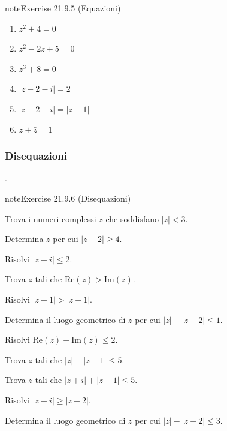 \documentclass[letterpaper,10pt,italian]{jupyterBook}
\begin{document}
\begin{sphinxadmonition}{note}{Exercise 21.9.5 (Equazioni)}
\begin{enumerate}
\item {} 
\sphinxAtStartPar
\(z^2 + 4 = 0\)

\item {} 
\sphinxAtStartPar
\(z^2 - 2z + 5 = 0\)

\item {} 
\sphinxAtStartPar
\(z^3 + 8 = 0\)

\item {} 
\sphinxAtStartPar
\(|z-2-i| = 2\)

\item {} 
\sphinxAtStartPar
\(|z-2-i| = |z-1|\)

\item {} 
\sphinxAtStartPar
\(z + \bar{z} = 1\)

\end{enumerate}


\end{sphinxadmonition}


\subsubsection{Disequazioni}
\label{\detokenize{ch/algebra/complex-algebra-problems:disequazioni}}\label{\detokenize{ch/algebra/complex-algebra-problems:math-hs-algebra-complex-problems-equations-ineq}}
\sphinxAtStartPar
{\hyperref[\detokenize{ch/algebra/complex-algebra-sol:math-hs-algebra-complex-sol-equations-ineq-sol}]{}}.
 \label{exercise:ch/algebra/complex-algebra-problems-exercise-5}

\begin{sphinxadmonition}{note}{Exercise 21.9.6 (Disequazioni)}



\sphinxAtStartPar
{} Trova i numeri complessi \(z\) che soddisfano \(|z| < 3\).

\sphinxAtStartPar
{} Determina \(z\) per cui \(|z - 2| \geq 4\).

\sphinxAtStartPar
{} Risolvi \(|z + i| \leq 2\).

\sphinxAtStartPar
{} Trova \(z\) tali che \(\text{Re}(z) > \text{Im}(z)\).

\sphinxAtStartPar
{} Risolvi \(|z - 1| > |z + 1|\).

\sphinxAtStartPar
{} Determina il luogo geometrico di \(z\) per cui \(|z| - |z-2| \leq 1\).

\sphinxAtStartPar
{} Risolvi \(\text{Re}(z) + \text{Im}(z) \leq 2\).

\sphinxAtStartPar
{} Trova \(z\) tali che \(|z| + |z - 1| \leq 5\).

\sphinxAtStartPar
{} Trova \(z\) tali che \(|z+i| + |z - 1| \leq 5\).

\sphinxAtStartPar
{} Risolvi \(|z - i| \geq |z + 2|\).

\sphinxAtStartPar
{} Determina il luogo geometrico di \(z\) per cui \(|z| - |z-2| \leq 3\).
\end{sphinxadmonition}
\end{document}
